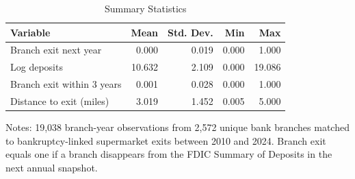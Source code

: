 \begin{table}[H]
\centering
\caption{Summary Statistics}
\begin{threeparttable}
\begin{tabular}{lrrrr}
\toprule
Variable & Mean & Std. Dev. & Min & Max \\
\midrule
Branch exit next year & 0.000 & 0.019 & 0.000 & 1.000 \\
Log deposits & 10.632 & 2.109 & 0.000 & 19.086 \\
Branch exit within 3 years & 0.001 & 0.028 & 0.000 & 1.000 \\
Distance to exit (miles) & 3.019 & 1.452 & 0.005 & 5.000 \\
\bottomrule
\end{tabular}
\begin{tablenotes}[flushleft]
\small
\item Notes: 19,038 branch-year observations from 2,572 unique bank branches matched to bankruptcy-linked supermarket exits between 2010 and 2024. Branch exit equals one if a branch disappears from the FDIC Summary of Deposits in the next annual snapshot.
\end{tablenotes}
\end{threeparttable}
\label{tab:summary}
\end{table}
